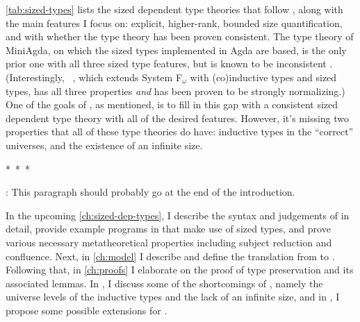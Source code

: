 \cref{tab:sized-types} lists the sized dependent type theories that follow \CIChat,
along with the main features I focus on:
explicit, higher-rank, bounded size quantification,
and with whether the type theory has been proven consistent.
The type theory of MiniAgda, on which the sized types implemented in Agda are based,
is the only prior one with all three sized type features,
but is known to be inconsistent%
\textsuperscript{}.
(Interestingly, \Fcopomega~\citep{F-omega-cop}, which extends System F$_\omega$ with (co)inductive types and sized types,
has all three properties \emph{and} has been proven to be strongly normalizing.)
One of the goals of \lang, as mentioned, is to fill in this gap
with a consistent sized dependent type theory with all of the desired features.
However, it's missing two properties that all of these type theories do have:
inductive types in the ``correct'' universes,
and the existence of an infinite size.


\begin{center}
\mbox{* * *}
\end{center}

\noindent \TODO: This paragraph should probably go at the end of the introduction.

\noindent In the upcoming \cref{ch:sized-dep-types}, I describe the syntax and judgements of \lang in detail,
provide example programs in \lang that make use of sized types,
and prove various necessary metatheoretical properties including subject reduction and confluence.
Next, in \cref{ch:model} I describe \CICE and define the translation from \lang to \CICE.
Following that, in \cref{ch:proofs} I elaborate on the proof of type preservation and its associated lemmas.
In \TODO, I discuss some of the shortcomings of \lang, namely the universe levels of the inductive types
and the lack of an infinite size,
and in \TODO, I propose some possible extensions for \lang.